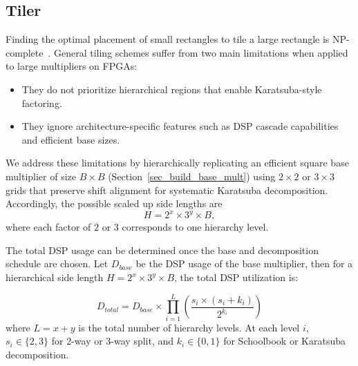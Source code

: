 \documentclass[conference]{IEEEtran}
\begin{document}
% 
\subsection{Tiler} \label{sec_tiler}
Finding the optimal placement of small rectangles to tile a large rectangle is NP-complete~\cite{BeumontTilingNPComplete2002}.
General tiling schemes suffer from two main limitations when applied to large multipliers on FPGAs:
\begin{itemize}
    \item They do not prioritize hierarchical regions that enable Karatsuba-style factoring.
    \item They ignore architecture-specific features such as DSP cascade capabilities and efficient base sizes.
\end{itemize}

We address these limitations by hierarchically replicating an efficient square base multiplier of size $B\times B$ (Section~\ref{sec_build_base_mult}) using $2\times2$ or $3\times3$ grids that preserve shift alignment for systematic Karatsuba decomposition.
Accordingly, the possible scaled up side lengths are
\[
H = 2^x \times 3^y \times B,
\]
where each factor of $2$ or $3$ corresponds to one hierarchy level.




The total DSP usage can be determined once the base and decomposition schedule are chosen.
Let $D_{\mathit{base}}$ be the DSP usage of the base multiplier, then
for a hierarchical side length $H=2^x\times 3^y\times B$, the total DSP utilization is:

\begin{equation*}
D_{\mathit{total}} = D_{\mathit{base}} \times \prod_{i=1}^{L} (\frac{s_i \times (s_i + k_i)}{2^{k_i}})
\end{equation*}
where $L=x+y$ is the total number of hierarchy levels. At each level $i$, $s_i\in\{2,3\}$ for 2-way or 3-way split, and $k_i\in\{0,1\}$ for Schoolbook or Karatsuba decomposition.
\end{document}
